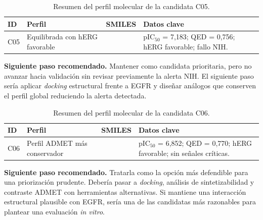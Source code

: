 \documentclass[IB]{TFUOC}%
\begin{document}
\begin{samepage}
\begin{table}[H]
    \centering
    \small
    \renewcommand{\arraystretch}{1.25}
    \begin{tabularx}{\textwidth}{p{1cm} p{3cm} Y p{4cm}}
        \hline
        \textbf{ID} & \textbf{Perfil} & \textbf{SMILES} & \textbf{Datos clave} \\
        \hline
        C05 &
        Equilibrada con hERG favorable &
        \texttt{} &
        pIC$_{50}$ = 7,183; QED = 0,756; hERG favorable; fallo NIH. \\
        \hline
    \end{tabularx}
    \caption{Resumen del perfil molecular de la candidata C05.}
    \label{tab:perfil_c05}
\end{table}

\noindent\textbf{Siguiente paso recomendado.}
Mantener como candidata prioritaria, pero no avanzar hacia validación sin revisar previamente la alerta NIH. El siguiente paso sería aplicar \textit{docking} estructural frente a EGFR y diseñar análogos que conserven el perfil global reduciendo la alerta detectada.
\end{samepage}

\vspace{0.35cm}

\begin{samepage}
\begin{table}[H]
    \centering
    \small
    \renewcommand{\arraystretch}{1.25}
    \begin{tabularx}{\textwidth}{p{1cm} p{3cm} Y p{4cm}}
        \hline
        \textbf{ID} & \textbf{Perfil} & \textbf{SMILES} & \textbf{Datos clave} \\
        \hline
        C06 &
        Perfil ADMET más conservador &
        \texttt{} &
        pIC$_{50}$ = 6,852; QED = 0,770; hERG favorable; sin señales críticas. \\
        \hline
    \end{tabularx}
    \caption{Resumen del perfil molecular de la candidata C06.}
    \label{tab:perfil_c06}
\end{table}

\noindent\textbf{Siguiente paso recomendado.}
Tratarla como la opción más defendible para una priorización prudente. Debería pasar a \textit{docking}, análisis de sintetizabilidad y contraste ADMET con herramientas alternativas. Si mantiene una interacción estructural plausible con EGFR, sería una de las candidatas más razonables para plantear una evaluación \textit{in vitro}.
\end{samepage}
\end{document}
